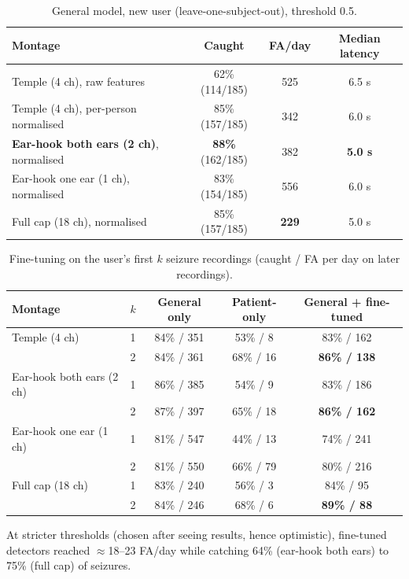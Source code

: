 \begin{table}[H]
\centering\small
\caption{General model, new user (leave-one-subject-out), threshold 0.5.}
\label{tab:general}
\begin{tabular}{@{}lccc@{}}
\toprule
Montage & Caught & FA/day & Median latency \\
\midrule
Temple (4 ch), raw features & 62\% (114/185) & 525 & 6.5 s \\
Temple (4 ch), per-person normalised & 85\% (157/185) & 342 & 6.0 s \\
\textbf{Ear-hook both ears (2 ch)}, normalised & \textbf{88\%} (162/185) & 382 & \textbf{5.0 s} \\
Ear-hook one ear (1 ch), normalised & 83\% (154/185) & 556 & 6.0 s \\
Full cap (18 ch), normalised & 85\% (157/185) & \textbf{229} & 5.0 s \\
\bottomrule
\end{tabular}
\end{table}

\begin{table}[H]
\centering\small
\caption{Fine-tuning on the user's first $k$ seizure recordings (caught / FA per day on later recordings).}
\label{tab:generalft}
\begin{tabular}{@{}llccc@{}}
\toprule
Montage & $k$ & General only & Patient-only & General + fine-tuned \\
\midrule
Temple (4 ch) & 1 & 84\% / 351 & 53\% / 8 & 83\% / 162 \\
 & 2 & 84\% / 361 & 68\% / 16 & \textbf{86\% / 138} \\
Ear-hook both ears (2 ch) & 1 & 86\% / 385 & 54\% / 9 & 83\% / 186 \\
 & 2 & 87\% / 397 & 65\% / 18 & \textbf{86\% / 162} \\
Ear-hook one ear (1 ch) & 1 & 81\% / 547 & 44\% / 13 & 74\% / 241 \\
 & 2 & 81\% / 550 & 66\% / 79 & 80\% / 216 \\
Full cap (18 ch) & 1 & 83\% / 240 & 56\% / 3 & 84\% / 95 \\
 & 2 & 84\% / 246 & 68\% / 6 & \textbf{89\% / 88} \\
\bottomrule
\end{tabular}
\end{table}

At stricter thresholds (chosen after seeing results, hence optimistic), fine-tuned detectors reached $\approx$18--23 FA/day while catching 64\% (ear-hook both ears) to 75\% (full cap) of seizures.


